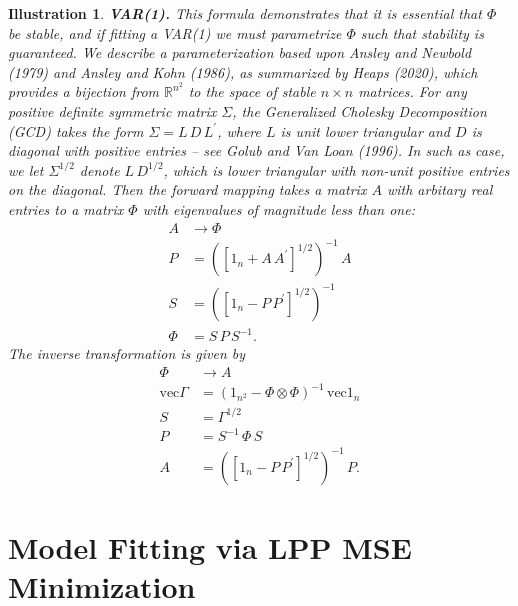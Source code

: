 \documentclass[a4paper]{book}
\def\RR{\mathbb R}
\def\tends{\rightarrow}
\newtheorem{Illustration}{Illustration}
\begin{document}
\begin{Illustration} {\bf  VAR(1).}
 This formula demonstrates that it is 
 essential that $\Phi$ be stable, and if fitting a VAR(1) we must parametrize $\Phi$
 such that stability is guaranteed.  We describe a parameterization based upon
 Ansley and Newbold (1979) and Ansley and Kohn (1986), as summarized by Heaps (2020),
  which  provides a bijection from $\RR^{n^2} $
 to the space of stable $n \times n $ matrices.
 For any positive definite symmetric matrix $\Sigma$, the Generalized Cholesky Decomposition
  (GCD) takes the form $\Sigma = L \, D \, L^{\prime}$, where
    $L$ is  unit lower triangular and $D$ is diagonal with positive entries --
    see Golub and Van Loan (1996).
    In such as case, we let $\Sigma^{1/2}$ denote $L \, D^{1/2}$, which is lower triangular
    with non-unit positive entries on the diagonal.
  Then the forward mapping takes a matrix $A$ with arbitary real entries to
  a matrix $\Phi$ with eigenvalues of magnitude less than one:
\begin{align*}
  A & \tends \Phi \\
  P & = { \left( { \left[  1_n + A \, A^{\prime} \right] }^{1/2} \right)}^{-1} \, A \\
  S & = { \left( { \left[ 1_n - P \, P^{\prime} \right] }^{1/2} \right) }^{-1} \\
  \Phi & = S \, P \, S^{-1}.
\end{align*}
    The inverse transformation is  given by
\begin{align*}
   \Phi & \tends A \\
  \mbox{vec} \Gamma & = { \left( 1_{n^2} - \Phi \otimes \Phi \right) }^{-1} \, 
  \mbox{vec} 1_n \\
  S & = \Gamma^{1/2} \\
  P & = S^{-1} \, \Phi \, S \\
  A & = { \left( { \left[ 1_n - P \, P^{\prime} \right] }^{1/2} \right) }^{-1} \, P.
\end{align*}
\end{Illustration}





\section{Model Fitting via LPP MSE Minimization}
\end{document}
